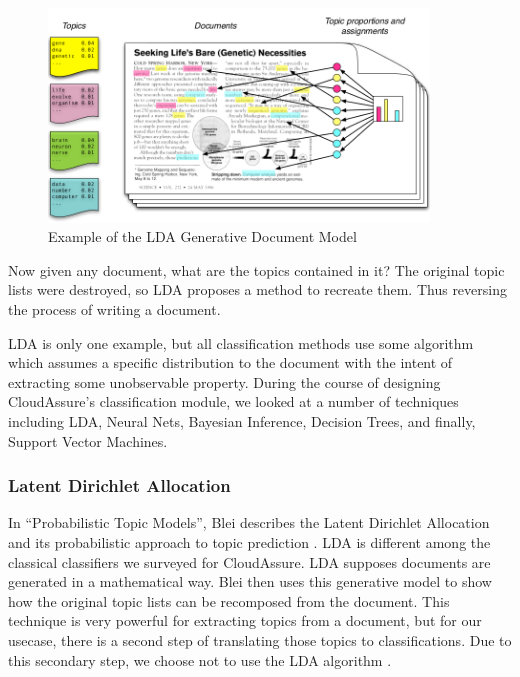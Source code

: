\begin{figure}[h!]
    \begin{center}
        \includegraphics[width=0.90\textwidth]{Figures/LDA_Generation.png}
        \caption{Example of the LDA Generative Document Model}
        \label{fig:LDA_Generative_Model}
    \end{center}
\end{figure}
Now given any document, what are the topics contained in it? The original topic
lists were destroyed, so \gls{LDA} proposes a method to recreate them. Thus reversing
the process of writing a document.

LDA is only one example, but all classification methods use some algorithm which assumes a specific
distribution to the document with the intent of extracting some unobservable
property. During the course of designing CloudAssure's classification module, we looked at a number of techniques
including \gls{LDA}, Neural Nets, Bayesian Inference, Decision Trees, and finally,
Support Vector Machines.

\subsubsection{Latent Dirichlet Allocation}
In ``Probabilistic Topic Models'', Blei describes the Latent Dirichlet
Allocation and its probabilistic approach to topic prediction
\autocite{Blei2012}. \gls{LDA} is different among the classical classifiers we
surveyed for CloudAssure. \gls{LDA} supposes documents are generated in
a mathematical way. Blei then uses this generative model to show how the original topic lists can be
recomposed from the document. This technique is very powerful for extracting
topics from a document, but for our usecase, there is a second step of
translating those topics to classifications. Due to this secondary step, we
choose not to use the LDA algorithm \autocite{RadimRehurek2010}.

